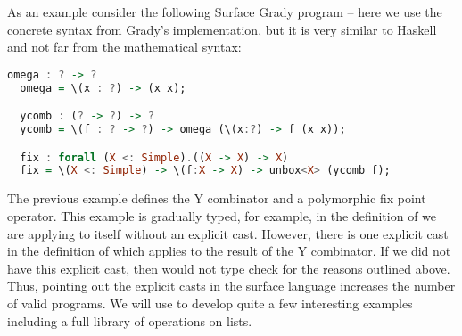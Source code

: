 As an example consider the following Surface Grady program -- here we
use the concrete syntax from Grady's implementation, but it is very
similar to Haskell and not far from the mathematical syntax:
\begin{lstlisting}[language=Haskell]
  omega : ? -> ?
  omega = \(x : ?) -> (x x);

  ycomb : (? -> ?) -> ?
  ycomb = \(f : ? -> ?) -> omega (\(x:?) -> f (x x));

  fix : forall (X <: Simple).((X -> X) -> X)
  fix = \(X <: Simple) -> \(f:X -> X) -> unbox<X> (ycomb f);
\end{lstlisting}
The previous example defines the Y combinator and a polymorphic fix
point operator.  This example is gradually typed, for example, in the
definition of  we are applying  to itself
without an explicit cast.  However, there is one explicit cast in the
definition of  which applies  to the
result of the Y combinator.  If we did not have this explicit cast,
then  would not type check for the reasons outlined
above.  Thus, pointing out the explicit casts in the surface language
increases the number of valid programs.  We will use  to
develop quite a few interesting examples including a full library of
operations on lists.


